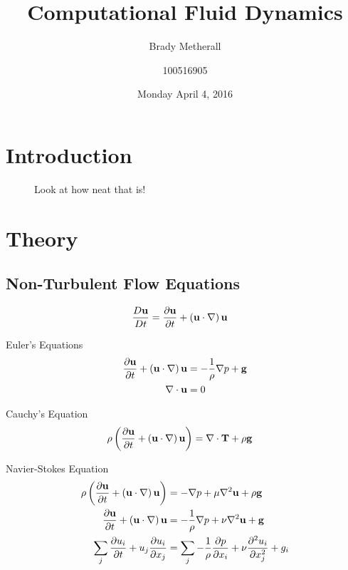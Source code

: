 \documentclass[10pt, titlepage]{article}
\title{Computational Fluid Dynamics}
\author{Brady Metherall \and 100516905}
\date{Monday April 4, 2016}
\begin{document}
\maketitle
\setlength\parindent{0pt}
\lstset{language=myMMA}

\listoffigures

\section{Introduction}

\begin{wrapfigure}{R}{0.5\textwidth}
\centering
{}
\caption[Pitching Airfoil Animation]{Look at how neat that is!}
\label{fig:airfoilanimation}
\end{wrapfigure}

\lipsum[1-4]

\section{Theory}

\subsection{Non-Turbulent Flow Equations}
\begin{align*}
\frac{D\bf{u}}{Dt} &= \frac{\partial \bf{u}}{\partial t} + \left( \bf{u} \cdot \nabla \right) \bf{u}
\end{align*}

Euler's Equations
\begin{equation}
\label{euler}
\begin{aligned}
\frac{\partial \bf{u}}{\partial t} + \left( \bf{u} \cdot \nabla \right) \bf{u} &= - \frac{1}{\rho} \nabla p + \bf{g} \\
\nabla \cdot \bf{u} &= 0
\end{aligned}
\end{equation}

Cauchy's Equation
\begin{align}
\rho \left( \frac{\partial \bf{u}}{\partial t} + \left( \bf{u} \cdot \nabla \right) \bf{u} \right) &= \nabla \cdot \bf{T} + \rho \bf{g}
\end{align}

Navier-Stokes Equation
\begin{equation}
\begin{aligned}
\rho \left( \frac{\partial \bf{u}}{\partial t} + \left( \bf{u} \cdot \nabla \right) \bf{u} \right) &= - \nabla p + \mu \nabla^2 \bf{u} + \rho \bf{g} \\
\frac{\partial \bf{u}}{\partial t} + \left( \bf{u} \cdot \nabla \right) \bf{u} &= - \frac{1}{\rho} \nabla p + \nu \nabla^2 \bf{u} + \bf{g} \\
\sum_j \frac{\partial u_i}{\partial t} + u_j \frac{\partial u_i}{\partial x_j} &= \sum_j  -\frac{1}{\rho} \frac{\partial p}{\partial x_i} + \nu \frac{\partial^2 u_i}{\partial x_j^2} + g_i
\end{aligned}
\end{equation}
\end{document}

